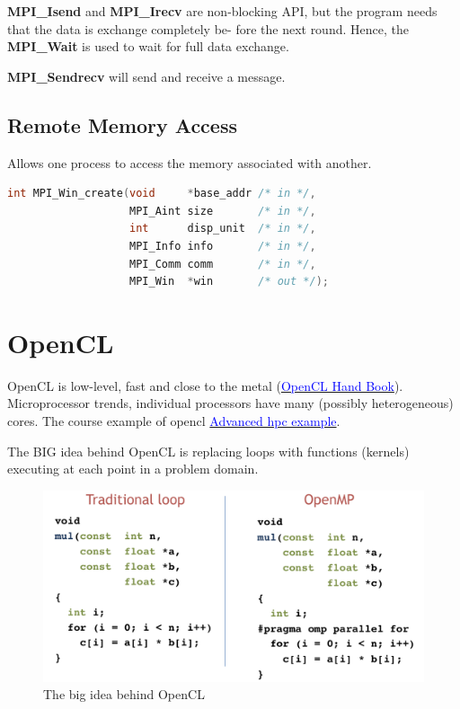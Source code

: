 \documentclass{article}
\begin{document}
\textbf{MPI\_Isend} and \textbf{MPI\_Irecv} are non-blocking API, but the program needs that the data is exchange completely be- fore the next round. Hence, the \textbf{MPI\_Wait} is used to wait for full data exchange.

\textbf{MPI\_Sendrecv} will send and receive a message.


\subsection{Remote Memory Access}

Allows one process to access the memory associated with another.

\begin{lstlisting}[language=C]
int MPI_Win_create(void     *base_addr /* in */,
                   MPI_Aint size       /* in */,
                   int      disp_unit  /* in */,
                   MPI_Info info       /* in */,
                   MPI_Comm comm       /* in */,
                   MPI_Win  *win       /* out */);
\end{lstlisting}

\section{OpenCL}

OpenCL is low-level, fast and close to the metal (\href{http://handsonopencl.github.io/}{\textcolor{blue}{OpenCL Hand Book}}). Microprocessor trends, individual processors have many (possibly heterogeneous) cores. The course example of opencl \href{https://github.com/UoB-HPC/advanced-hpc-examples}{\textcolor{blue}{Advanced hpc example}}.


The BIG idea behind OpenCL is replacing loops with functions (kernels) executing at each point in a problem domain.

\begin{figure}[h]
    \centering
    \includegraphics[width=\linewidth]{images/big-idea-behind-opencl.png}
    \caption{The big idea behind OpenCL}
    \label{fig:my_label}
\end{figure}
\end{document}
